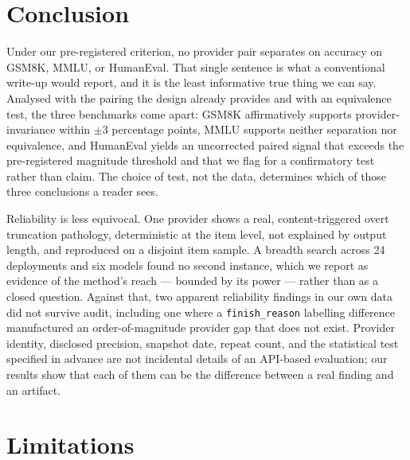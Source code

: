 \documentclass[11pt]{article}
\begin{document}
\section{Conclusion}

Under our pre-registered criterion, no provider pair separates on
accuracy on GSM8K, MMLU, or HumanEval. That single sentence is what a
conventional write-up would report, and it is the least informative
true thing we can say. Analysed with the pairing the design already
provides and with an equivalence test, the three benchmarks come apart:
GSM8K affirmatively supports provider-invariance within $\pm$3
percentage points, MMLU supports neither separation nor equivalence,
and HumanEval yields an uncorrected paired signal that exceeds the
pre-registered magnitude threshold and that we flag for a confirmatory
test rather than claim. The choice of test, not the data, determines
which of those three conclusions a reader sees.

Reliability is less equivocal. One provider shows a real,
content-triggered overt truncation pathology, deterministic at the
item level, not explained by output length, and reproduced on a
disjoint item sample. A breadth search across 24 deployments and six
models found no second instance, which we report as evidence of the
method's reach --- bounded by its power --- rather than as a closed
question. Against that, two apparent reliability findings in our own
data did not survive audit, including one where a
\texttt{finish\_reason} labelling difference manufactured an
order-of-magnitude provider gap that does not exist. Provider
identity, disclosed precision, snapshot date, repeat count, and the
statistical test specified in advance are not incidental details of an
API-based evaluation; our results show that each of them can be the
difference between a real finding and an artifact.

\section{Limitations}
\label{sec:limitations}
\end{document}
